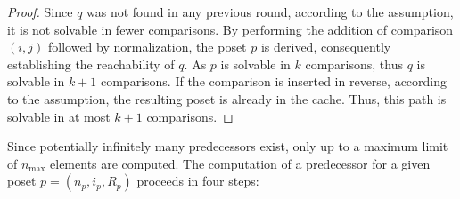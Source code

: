 \documentclass[10pt,journal,compsoc]{IEEEtran}
\begin{document}
\begin{proof} \label{proof:predecessor_calculation}
  Since $q$ was not found in any previous round, according to the assumption, it is not solvable in fewer comparisons.
  By performing the addition of comparison $(i, j)$ followed by normalization, the poset $p$ is derived, consequently establishing the reachability of $q$.
  As $p$ is solvable in $k$ comparisons, thus $q$ is solvable in $k + 1$ comparisons.
  If the comparison is inserted in reverse, according to the assumption, the resulting poset is already in the cache.
  Thus, this path is solvable in at most $k + 1$ comparisons.
\end{proof}

Since potentially infinitely many predecessors exist, only up to a maximum limit of $n_{\text{max}}$ elements are computed.
The computation of a predecessor for a given poset $p = (n_p, i_p, R_p)$ proceeds in four steps:
\end{document}
